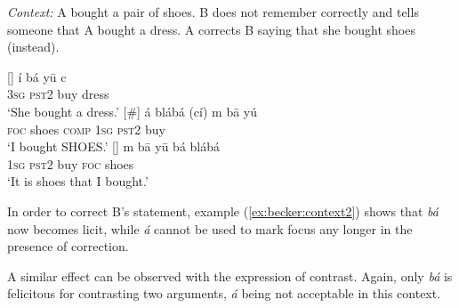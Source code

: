 \documentclass[output=paper,
modfonts
]{langscibook}
\begin{document}
\begin{exe}
\ex
\textit{Context:} A bought a pair of shoes. B does not remember correctly and tells someone that A bought a dress. A corrects B saying that she bought shoes (instead). 
\label{ex:becker:context2}
\begin{xlist}
[] {
\gll \'i b\'a y\=u c\\
 	\textsc{3sg} \textsc{pst2} buy dress\\
\glt `She bought a dress.'\label{ex:becker:7B}}
[\#] {
\gll \'a bl\'ab\'a (c\'i) m b\=a y\'u \\
\textsc{foc} shoes \textsc{comp} \textsc{1sg} \textsc{pst2} buy\\
\glt `I bought SHOES.'}
[] {
\gll m b\=a y\=u b\'a bl\'ab\'a\\
\textsc{1sg} \textsc{pst2} buy  \textsc{foc} shoes\\
\glt `It is shoes that I bought.' }
\end{xlist}
\end{exe}
In order to correct B's statement, example (\ref{ex:becker:context2}) shows that \textit{bá} now becomes licit, while \textit{á} cannot be used to mark focus any longer in the presence of correction.

A similar effect can be observed with the expression of contrast. Again, only \textit{bá} is felicitous for contrasting two arguments, \textit{á} being not acceptable in this context.
\end{document}
